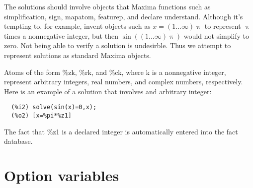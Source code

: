 \documentclass[]{scrartcl}
\begin{document}
The solutions should involve objects that Maxima functions such as simplification, sign, mapatom, featurep, and declare understand. Although it's tempting to, for example, invent objects such as
\(x = (1 ... \infty) \uppi\) to represent \(\uppi\) times a nonnegative integer, but then
\(\sin \left ((1 ... \infty) \uppi \right) \) would not simplify to zero. Not being able to verify a
solution is undesirble. Thus we attempt to represent solutions as standard Maxima objects.

Atoms of the form \%zk, \%rk, and \%ck, where k is a nonnegative integer, represent arbitrary integers, real numbers, and complex numbers, respectively. Here is an example of a solution that involves and arbitrary integer:
\begin{verbatim}
  (%i2)	solve(sin(x)=0,x);
  (%o2)	[x=%pi*%z1]
\end{verbatim}
The fact that \%z1 is a declared integer is automatically entered into the fact database.



\section{Option variables}
\end{document}

